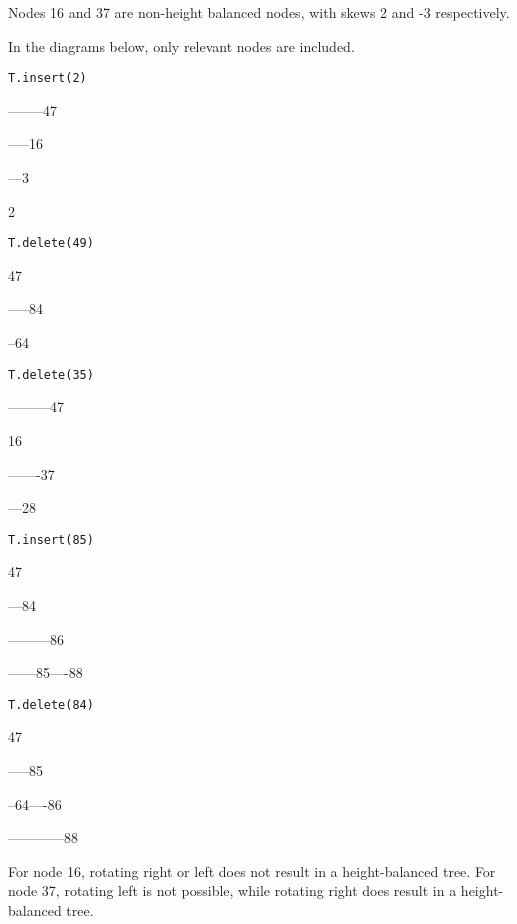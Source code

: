 \documentclass[12pt,twoside]{article}
\begin{document}


\begin{problems}

\problem  %

\begin{problemparts}
\problempart %
Nodes 16 and 37 are non-height balanced nodes, with skews 2 and -3 respectively.

\problempart %
In the diagrams below, only relevant nodes are included. 

\verb|T.insert(2)|

--------47

-----16

---3

2

\verb|T.delete(49)|

47

-----84

--64

\verb|T.delete(35)|

---------47

16

-------37

---28

\verb|T.insert(85)|

47

---84

---------86

------85----88

\verb|T.delete(84)|

47

-----85

--64----86

------------88

\problempart %
For node 16, rotating right or left does not result in a height-balanced tree. For node 37, rotating left is not possible, while rotating right does result in a height-balanced tree.

\end{problemparts}


\end{problems}
\end{document}
